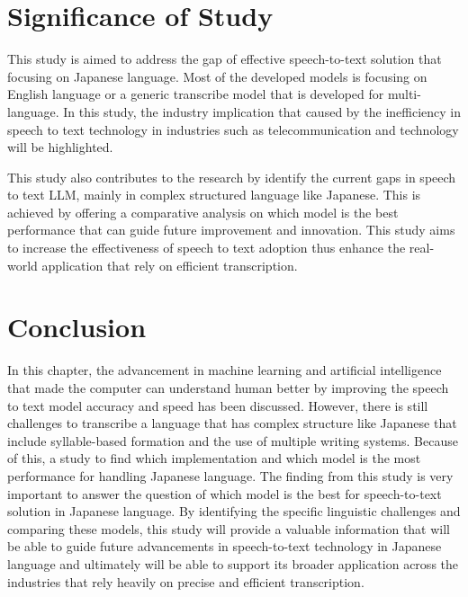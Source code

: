 \section{Significance of Study}
This study is aimed to address the gap of effective speech-to-text solution that focusing on Japanese language. Most of the developed models is focusing on English language or a generic transcribe model that is developed for multi-language. In this study, the industry implication that caused by the inefficiency in speech to text technology in industries such as telecommunication and technology will be highlighted. 

This study also contributes to the research by identify the current gaps in speech to text LLM, mainly in complex structured language like Japanese. This is achieved by offering a comparative analysis on which model is the best performance that can guide future improvement and innovation. This study aims to increase the effectiveness of speech to text adoption thus enhance the real-world application that rely on efficient transcription. 

\section{Conclusion}
In this chapter, the advancement in machine learning and artificial intelligence that made the computer can understand human better by improving the speech to text model accuracy and speed has been discussed. However, there is still challenges to transcribe a language that has complex structure like Japanese that include syllable-based formation and the use of multiple writing systems. Because of this, a study to find which implementation and which model is the most performance for handling Japanese language. The finding from this study is very important to answer the question of which model is the best for speech-to-text solution in Japanese language. By identifying the specific linguistic challenges and comparing these models, this study will provide a valuable information that will be able to guide future advancements in speech-to-text technology in Japanese language and ultimately will be able to support its broader application across the industries that rely heavily on precise and efficient transcription.

